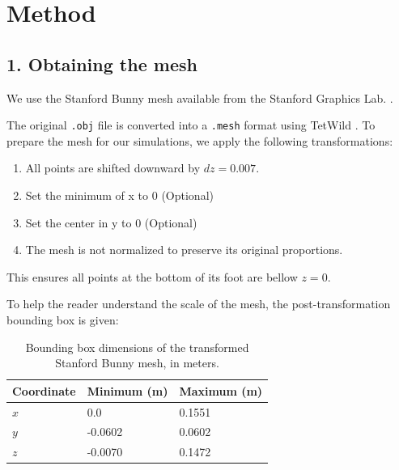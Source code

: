 \documentclass[a4paper,12pt]{article}
\begin{document}
\section*{Method}

\subsection*{1. Obtaining the mesh}

We use the Stanford Bunny mesh available from the Stanford Graphics Lab. \cite{stanford_bunny}.

The original \texttt{.obj} file is converted into a \texttt{.mesh} format using TetWild \cite{tetwild}. To prepare the mesh for our simulations, we apply the following transformations:

\begin{enumerate}
	\item All points are shifted downward by \( dz = 0.007 \).
	\item Set the minimum of x to 0 (Optional)
	\item Set the center in y to 0 (Optional)
	\item The mesh is not normalized to preserve its original proportions.
\end{enumerate}

This ensures all points at the bottom of its foot are bellow $z=0$.

To help the reader understand the scale of the mesh, the post-transformation bounding box is given:

\begin{table}[h!]
	\centering
	\begin{tabular}{@{}lll@{}}
		\toprule
		Coordinate & Minimum (m) & Maximum (m) \\ \midrule
		\(x\)      & 0.0         & 0.1551      \\
		\(y\)      & -0.0602     & 0.0602      \\
		\(z\)      & -0.0070     & 0.1472      \\ \bottomrule
	\end{tabular}
	\caption{Bounding box dimensions of the transformed Stanford Bunny mesh, in meters. }
\end{table}
\end{document}
